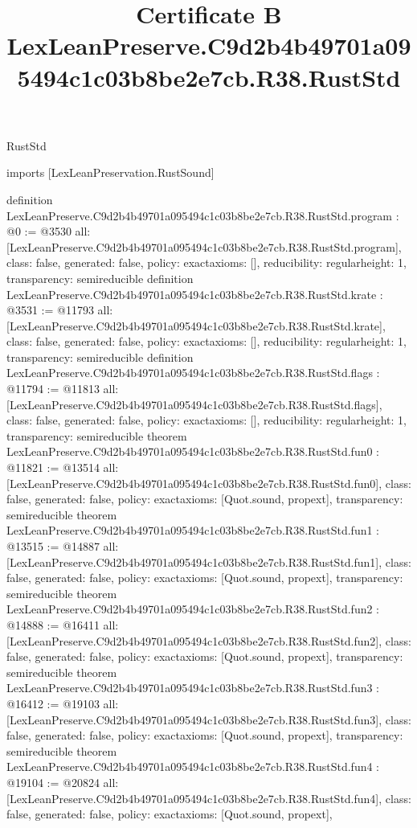 \begin{lexlean}{RustStd}
\title{Certificate B LexLeanPreserve.C9d2b4b49701a095494c1c03b8be2e7cb.R38.RustStd}
\begin{coremodule}
imports [LexLeanPreservation.RustSound]

definition LexLeanPreserve.C9d2b4b49701a095494c1c03b8be2e7cb.R38.RustStd.program : @0 := @3530 {
  all: [LexLeanPreserve.C9d2b4b49701a095494c1c03b8be2e7cb.R38.RustStd.program],
  class: false,
  generated: false,
  policy: exact{axioms: []},
  reducibility: regular{height: 1},
  transparency: semireducible
}
definition LexLeanPreserve.C9d2b4b49701a095494c1c03b8be2e7cb.R38.RustStd.krate : @3531 := @11793 {
  all: [LexLeanPreserve.C9d2b4b49701a095494c1c03b8be2e7cb.R38.RustStd.krate],
  class: false,
  generated: false,
  policy: exact{axioms: []},
  reducibility: regular{height: 1},
  transparency: semireducible
}
definition LexLeanPreserve.C9d2b4b49701a095494c1c03b8be2e7cb.R38.RustStd.flags : @11794 := @11813 {
  all: [LexLeanPreserve.C9d2b4b49701a095494c1c03b8be2e7cb.R38.RustStd.flags],
  class: false,
  generated: false,
  policy: exact{axioms: []},
  reducibility: regular{height: 1},
  transparency: semireducible
}
theorem LexLeanPreserve.C9d2b4b49701a095494c1c03b8be2e7cb.R38.RustStd.fun0 : @11821 := @13514 {
  all: [LexLeanPreserve.C9d2b4b49701a095494c1c03b8be2e7cb.R38.RustStd.fun0],
  class: false,
  generated: false,
  policy: exact{axioms: [Quot.sound, propext]},
  transparency: semireducible
}
theorem LexLeanPreserve.C9d2b4b49701a095494c1c03b8be2e7cb.R38.RustStd.fun1 : @13515 := @14887 {
  all: [LexLeanPreserve.C9d2b4b49701a095494c1c03b8be2e7cb.R38.RustStd.fun1],
  class: false,
  generated: false,
  policy: exact{axioms: [Quot.sound, propext]},
  transparency: semireducible
}
theorem LexLeanPreserve.C9d2b4b49701a095494c1c03b8be2e7cb.R38.RustStd.fun2 : @14888 := @16411 {
  all: [LexLeanPreserve.C9d2b4b49701a095494c1c03b8be2e7cb.R38.RustStd.fun2],
  class: false,
  generated: false,
  policy: exact{axioms: [Quot.sound, propext]},
  transparency: semireducible
}
theorem LexLeanPreserve.C9d2b4b49701a095494c1c03b8be2e7cb.R38.RustStd.fun3 : @16412 := @19103 {
  all: [LexLeanPreserve.C9d2b4b49701a095494c1c03b8be2e7cb.R38.RustStd.fun3],
  class: false,
  generated: false,
  policy: exact{axioms: [Quot.sound, propext]},
  transparency: semireducible
}
theorem LexLeanPreserve.C9d2b4b49701a095494c1c03b8be2e7cb.R38.RustStd.fun4 : @19104 := @20824 {
  all: [LexLeanPreserve.C9d2b4b49701a095494c1c03b8be2e7cb.R38.RustStd.fun4],
  class: false,
  generated: false,
  policy: exact{axioms: [Quot.sound, propext]},
}
\end{coremodule}
\end{lexlean}

